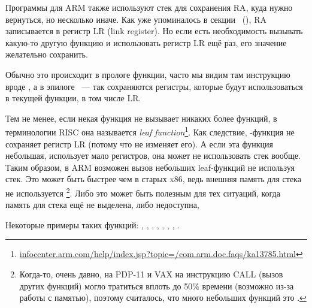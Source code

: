Программы для ARM также используют стек для сохранения \ac{RA}, куда нужно вернуться, но несколько иначе.
Как уже упоминалось в секции \q{\HelloWorldSectionName}~(),
\ac{RA} записывается в регистр \ac{LR} (\gls{link register}).
Но если есть необходимость вызывать какую-то другую функцию и использовать регистр \ac{LR} ещё
раз, его значение желательно сохранить.

Обычно это происходит в прологе функции, часто мы видим там инструкцию вроде , а в эпилоге
~--- так сохраняются регистры, которые будут использоваться в текущей функции, в том числе \ac{LR}.

Тем не менее, если некая функция не вызывает никаких более функций, в терминологии \ac{RISC} она называется
\emph{\gls{leaf function}}\footnote{\href{http://infocenter.arm.com/help/index.jsp?topic=/com.arm.doc.faqs/ka13785.html}{infocenter.arm.com/help/index.jsp?topic=/com.arm.doc.faqs/ka13785.html}}. 
Как следствие, -функция не сохраняет регистр \ac{LR} (потому что не изменяет его).
А если эта функция небольшая, использует мало регистров, она может не использовать стек вообще.
Таким образом, в ARM возможен вызов небольших leaf-функций не используя стек.
Это может быть быстрее чем в старых x86, ведь внешняя память для стека не используется
\footnote{Когда-то, очень давно, на PDP-11 и VAX на инструкцию CALL (вызов других функций) могло тратиться
вплоть до 50\% времени (возможно из-за работы с памятью),
поэтому считалось, что много небольших функций это 
.}.
Либо это может быть полезным для тех ситуаций, когда память для стека ещё не выделена, либо недоступна,

Некоторые примеры таких функций:
, , 
, , ,
, , .

